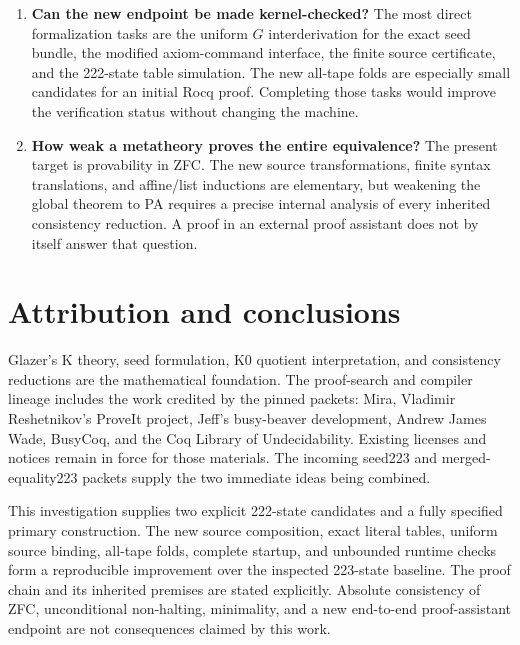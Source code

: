 \begin{enumerate}
\item \textbf{Can the new endpoint be made kernel-checked?}
The most direct formalization tasks are the uniform $G$ interderivation
for the exact seed bundle, the modified axiom-command interface, the
finite source certificate, and the 222-state table simulation. The
new all-tape folds are especially small candidates for an initial
Rocq proof. Completing those tasks would improve the verification
status without changing the machine.

\item \textbf{How weak a metatheory proves the entire equivalence?}
The present target is provability in ZFC. The new source transformations,
finite syntax translations, and affine/list inductions are elementary,
but weakening the global theorem to PA requires a precise internal
analysis of every inherited consistency reduction. A proof in an
external proof assistant does not by itself answer that question.
\end{enumerate}

\section{Attribution and conclusions}

Glazer's K theory, seed formulation, K0 quotient interpretation, and
consistency reductions are the mathematical foundation. The proof-search
and compiler lineage includes the work credited by the pinned packets:
Mira, Vladimir Reshetnikov's ProveIt project, Jeff's busy-beaver
development, Andrew James Wade, BusyCoq, and the Coq Library of
Undecidability. Existing licenses and notices remain in force for those
materials. The incoming seed223 and merged-equality223 packets supply
the two immediate ideas being combined.

This investigation supplies two explicit 222-state candidates and a
fully specified primary construction. The new source composition,
exact literal tables, uniform source binding, all-tape folds, complete
startup, and unbounded runtime checks form a reproducible improvement
over the inspected 223-state baseline. The proof chain and its inherited
premises are stated explicitly. Absolute consistency of ZFC,
unconditional non-halting, minimality, and a new end-to-end
proof-assistant endpoint are not consequences claimed by this work.
